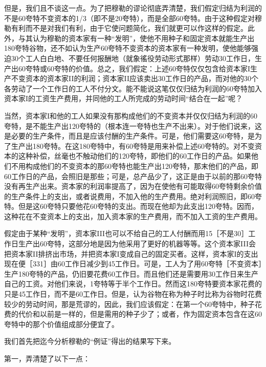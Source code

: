 但是，我们且不谈这一点。为了把穆勒的谬论彻底弄清楚，我们假定归结为利润的不是60夸特不变资本的1/3（即不是20夸特），而是全部60夸特。由于这种假定对穆勒有利而不是对我们有利，由于它使问题简化，我们就更可以作这样的假定。此外，与其认为穆勒的资本家有一种“发明”，使他不用种子和固定资本就能生产出180夸特谷物，还不如认为生产60夸特不变资本的资本家有一种发明，使他能够强迫30个工人白白地、不要任何报酬地（就象徭役劳动形式那样）劳动30工作日，生产出60夸特或60夸特的价值。总之，我们假定：上述60夸特仅仅包含给资本家I生产不变资本的资本家II的利润；资本家II应该卖出30工作日的产品，而对他的30个各劳动了一个工作日的工人不付分文。能不能说这笔仅仅归结为利润的60夸特加入资本家I的工资生产费用，并同他的工人所完成的劳动时间“结合在一起”呢？

当然，资本家I和他的工人如果没有那构成他们的不变资本并仅仅归结为利润的60夸特，是不能生产出120夸特的（根本连一夸特也生产不出来）。对于他们说来，这是必要的生产条件，而且是应该付酬的生产条件。可是，他们需要这60夸特，是为了生产出180夸特。在这180夸特中，有60夸特是用来补偿上述60夸特的。对不变资本的这种补偿，丝毫也不触动他们的120夸特，即他们的60工作日的产品。如果他们不用构成他们的不变资本的那60夸特也能生产出120夸特，那末他们的产品，即60工作日的产品，会照旧是那些；可是，总产品少了，这正是由于以前的那60夸特没有再生产出来。资本家的利润率提高了，因为在使他有可能取得60夸特剩余价值的生产条件上的支出，或者说费用，不加入他的生产费用。绝对利润照旧，即60夸特。但是这60夸特只要他花60夸特的支出。而现在他却为此支出120夸特。因而，这种花在不变资本上的支出，加入资本家的生产费用，而不加入工资的生产费用。

假定由于某种“发明”，资本家III也可以不给自己的工人付酬而用15［不是30］工作日生产出60夸特，这部分地是因为他采用了更好的机器等等。这个资本家III会把资本家II排挤出市场，并把资本家I变成自己的固定买者。这样，资本家I的支出现在便［331］由60工作日减少到45工作日。可是，工人为了用60夸特［不变资本］生产180夸特的产品，仍旧要花费60工作日。而且他们还是需要用30工作日来生产自己的工资。对他们来说，1夸特等于半个工作日。然而这180夸特要资本家花费的只是45工作日，而不是60工作日。但是，认为谷物在称为种子时比称为谷物时花费较少的劳动时间，那是荒谬的，因此，我们应该假定：在第一个60夸特中，种子花费的代价和以前是一样的，但是需用的种子少了；或者，作为固定资本包含在这60夸特中的那个价值组成部分便宜了。


我们首先把迄今分析穆勒的“例证”得出的结果写下来。

第一，弄清楚了以下一点：

